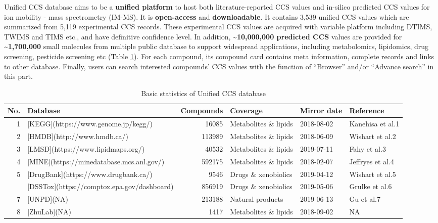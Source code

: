 \documentclass[12pt,]{book}
\begin{document}
Unified CCS database aims to be a \textbf{unified platform} to host both
literature-reported CCS values and in-silico predicted CCS values for
ion mobility - mass spectrometry (IM-MS). It is \textbf{open-access} and
\textbf{downloadable}. It contains 3,539 unified CCS values which are
summarized from 5,119 experimental CCS records. These experimental CCS
values are acquired with variable platform including DTIMS, TWIMS and
TIMS etc., and have definitive confidence level. In addition,
\textbf{\textasciitilde{}10,000,000 predicted CCS} values are provided
for \textbf{\textasciitilde{}1,700,000} small molecules from multiple
public database to support widespread applications, including
metabolomics, lipidomics, drug screening, pesticide screening etc (Table
\ref{tab:table2d1}). For each compound, its compound card contains meta
information, complete records and links to other database. Finally,
users can search interested compounds' CCS values with the function of
``Browser'' and/or ``Advance search'' in this part.

\begin{table}

\caption{\label{tab:table2d1}Basic statistics of Unified CCS database}
\centering
\begin{tabular}[t]{rlrlll}
\toprule
No. & Database & Compounds & Coverage & Mirror date & Reference\\
\midrule
1 & [KEGG](https://www.genome.jp/kegg/) & 16085 & Metabolites \& lipids & 2018-08-02 & Kanehisa et al.1\\
2 & [HMDB](http://www.hmdb.ca/) & 113989 & Metabolites \& lipids & 2018-06-09 & Wishart et al.2\\
3 & [LMSD](https://www.lipidmaps.org/) & 40532 & Metabolites \& lipids & 2019-07-11 & Fahy et al.3\\
4 & [MINE](https://minedatabase.mcs.anl.gov/) & 592175 & Metabolites \& lipids & 2018-02-07 & Jeffryes et al.4\\
5 & [DrugBank](https://www.drugbank.ca/) & 9546 & Drugs \& xenobiolics & 2019-04-12 & Wishart et al.5\\
\addlinespace
6 & [DSSTox](https://comptox.epa.gov/dashboard) & 856919 & Drugs \& xenobiolics & 2019-05-06 & Grulke et al.6\\
7 & [UNPD](NA) & 213188 & Natural products & 2019-06-13 & Gu et al.7\\
8 & [ZhuLab](NA) & 1417 & Metabolites \& lipids & 2018-09-02 & NA\\
\bottomrule
\end{tabular}
\end{table}
\end{document}
